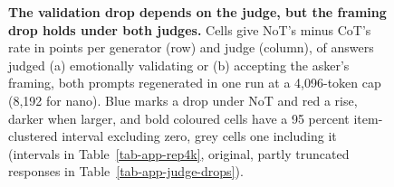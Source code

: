 \begin{figure}[t]
\centering

\caption{\textbf{The validation drop depends on the judge, but the framing
drop holds under both judges.} Cells give NoT's minus CoT's rate in points per
generator (row) and judge (column), of answers judged (a) emotionally
validating or (b) accepting the asker's framing, both prompts regenerated in
one run at a 4,096-token cap (8,192 for nano). Blue marks a drop under NoT and
red a rise, darker when larger, and bold coloured cells have a 95 percent
item-clustered interval excluding zero, grey cells one including it
(intervals in Table~\ref{tab-app-rep4k}, original, partly truncated responses
in Table~\ref{tab-app-judge-drops}).}
\label{fig:judges}
\end{figure}
